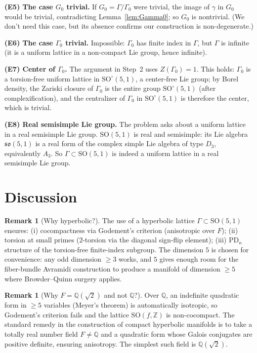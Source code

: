 \documentclass[12pt]{article}
\theoremstyle{definition}
\newtheorem{remark}[theorem]{Remark}
\begin{document}
\medskip

\noindent\textbf{(E5) The case $G_0$ trivial.} If $G_0=\Gamma/\Gamma_0$ were trivial, the image of $\gamma$ in $G_0$ would be trivial, contradicting Lemma~\ref{lem:Gamma0}; so $G_0$ is nontrivial. (We don't need this case, but its absence confirms our construction is non-degenerate.)

\medskip

\noindent\textbf{(E6) The case $\Gamma_0$ trivial.} Impossible: $\Gamma_0$ has finite index in $\Gamma$, but $\Gamma$ is infinite (it is a uniform lattice in a non-compact Lie group, hence infinite).

\medskip

\noindent\textbf{(E7) Center of $\Gamma_0$.} The argument in Step~2 uses $Z(\Gamma_0)=1$. This holds: $\Gamma_0$ is a torsion-free uniform lattice in $\mathrm{SO}^\circ(5,1)$, a center-free Lie group; by Borel density, the Zariski closure of $\Gamma_0$ is the entire group $\mathrm{SO}^\circ(5,1)$ (after complexification), and the centralizer of $\Gamma_0$ in $\mathrm{SO}^\circ(5,1)$ is therefore the center, which is trivial.

\medskip

\noindent\textbf{(E8) Real semisimple Lie group.} The problem asks about a uniform lattice in a real semisimple Lie group. $\mathrm{SO}(5,1)$ is real and semisimple: its Lie algebra $\mathfrak{so}(5,1)$ is a real form of the complex simple Lie algebra of type $D_3$, equivalently $A_3$. So $\Gamma\subset\mathrm{SO}(5,1)$ is indeed a uniform lattice in a real semisimple Lie group.

\section{Discussion}

\begin{remark}[Why hyperbolic?]
The use of a hyperbolic lattice $\Gamma\subset\mathrm{SO}(5,1)$ ensures: (i) cocompactness via Godement's criterion (anisotropic over $F$); (ii) torsion at small primes ($2$-torsion via the diagonal sign-flip element); (iii) PD$_n$ structure of the torsion-free finite-index subgroup. The dimension $5$ is chosen for convenience: any odd dimension $\geq 3$ works, and $5$ gives enough room for the fiber-bundle Avramidi construction to produce a manifold of dimension $\geq 5$ where Browder--Quinn surgery applies.
\end{remark}

\begin{remark}[Why $F=\mathbb{Q}(\sqrt{2})$ and not $\mathbb{Q}$?]
Over $\mathbb{Q}$, an indefinite quadratic form in $\geq 5$ variables (Meyer's theorem) is automatically isotropic, so Godement's criterion fails and the lattice $\mathrm{SO}(f,\mathbb{Z})$ is non-cocompact. The standard remedy in the construction of compact hyperbolic manifolds is to take a totally real number field $F\neq\mathbb{Q}$ and a quadratic form whose Galois conjugates are positive definite, ensuring anisotropy. The simplest such field is $\mathbb{Q}(\sqrt{2})$.
\end{remark}
\end{document}
